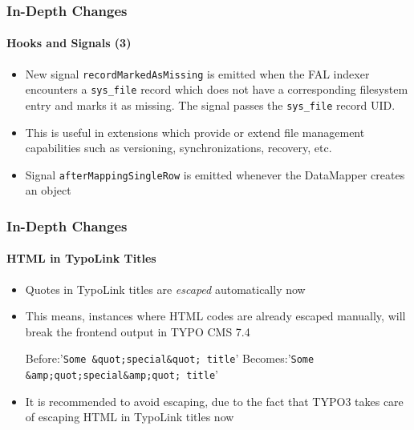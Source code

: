 \begin{frame}[fragile]
	\frametitle{In-Depth Changes}
	\framesubtitle{Hooks and Signals (3)}

	\begin{itemize}

		\item New signal \texttt{recordMarkedAsMissing} is emitted when the FAL indexer encounters a
			\texttt{sys\_file} record which does not have a corresponding filesystem entry and marks it as
			missing. The signal passes the \texttt{sys\_file} record UID.

		\item This is useful in extensions which provide or extend file management capabilities such as
			versioning, synchronizations, recovery, etc.

		\item Signal \texttt{afterMappingSingleRow} is emitted whenever the DataMapper creates an object

	\end{itemize}

\end{frame}


\begin{frame}[fragile]
	\frametitle{In-Depth Changes}
	\framesubtitle{HTML in TypoLink Titles}

	\lstset{basicstyle=\tiny\ttfamily}

	\begin{itemize}

		\item Quotes in TypoLink titles are \textit{escaped} automatically now
		\item This means, instances where HTML codes are already escaped manually,
			will break the frontend output in TYPO CMS 7.4

			Before:\tabto{1.8cm}'\texttt{Some \&quot;special\&quot; title}'\newline
			Becomes:\tabto{1.8cm}'\texttt{Some \&amp;quot;special\&amp;quot; title}'

		\item It is recommended to avoid escaping, due to the fact that TYPO3 takes care of escaping
			HTML in TypoLink titles now

	\end{itemize}

	\breakingchange

\end{frame}

